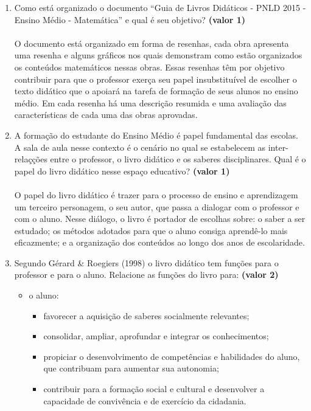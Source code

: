 \documentclass[a4paper, 12pt]{article}
\begin{document}
\begin{enumerate}
\item Como está organizado o documento ``Guia de Livros Didáticos - PNLD 2015 - Ensino Médio - Matemática'' e qual é seu objetivo? \textbf{(valor 1)} \\\\
  O documento está organizado em forma de resenhas, cada obra apresenta uma resenha e alguns gráficos nos quais demonstram como estão organizados os conteúdos matemáticos nessas obras. Essas resenhas têm por objetivo contribuir para que o professor exerça seu papel insubstituível de escolher o texto didático que o apoiará na tarefa de formação de seus alunos no ensino médio. Em cada resenha há uma descrição resumida e uma avaliação das características de cada uma das obras aprovadas. \\
\item  A formação do estudante do Ensino Médio é papel fundamental das escolas. A sala de aula nesse contexto é o cenário no qual se estabelecem as inter-relaçções entre o professor, o livro didático e os saberes disciplinares. Qual é o papel do livro didático nesse espaço educativo? \textbf{(valor 1)} \\\\
  O papel do livro didático é trazer para o processo de ensino e aprendizagem um terceiro personagem, o seu autor, que passa a dialogar com o professor e com o aluno. Nesse diálogo, o livro é portador de escolhas sobre: o saber a ser estudado; os métodos adotados para que o aluno consiga aprendê-lo mais eficazmente; e a organização dos conteúdos ao longo dos anos de escolaridade.
\item Segundo Gérard \& Roegiers (1998) o livro didático tem funções para o professor e para o aluno.  Relacione as funções do livro para: \textbf{(valor 2)}
  \begin{itemize}
  \item o aluno: \\
    \begin{itemize}
    \item favorecer a aquisição de saberes socialmente relevantes;
    \item consolidar, ampliar, aprofundar e integrar os conhecimentos;
    \item propiciar o desenvolvimento de competências e habilidades do aluno, que contribuam para aumentar sua autonomia;
    \item contribuir para a formação social e cultural e desenvolver a capacidade de convivência e de exercício da cidadania.

\end{itemize}
\end{itemize}
\end{enumerate}
\end{document}
